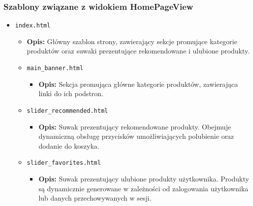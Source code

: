 \documentclass[12pt,a4paper,oneside]{article}
\theoremstyle{definition}
\numberwithin{equation}{section}
\begin{document}
\begin{itemize}
    \subsubsection{Szablony związane z widokiem HomePageView}
    \begin{itemize}
        \item \texttt{index.html}
        \begin{itemize}
            \item \textbf{Opis:} 
            Główny szablon strony, zawierający sekcje promujące kategorie produktów oraz suwaki prezentujące rekomendowane i ulubione produkty.
            
            \item \texttt{main\_banner.html} 
            \begin{itemize}
                \item \textbf{Opis:} 
                Sekcja promująca główne kategorie produktów, zawierająca linki do ich podstron.
            \end{itemize}
    
            \item \texttt{slider\_recommended.html} 
            \begin{itemize}
                \item \textbf{Opis:} 
                Suwak prezentujący rekomendowane produkty. Obejmuje dynamiczną obsługę przycisków umożliwiających polubienie oraz dodanie do koszyka.
            \end{itemize}
    
            \item \texttt{slider\_favorites.html} 
            \begin{itemize}
                \item \textbf{Opis:} 
                Suwak prezentujący ulubione produkty użytkownika. Produkty są dynamicznie generowane w zależności od zalogowania użytkownika lub danych przechowywanych w sesji.
            \end{itemize}
        \end{itemize}
    \end{itemize}


\end{itemize}
\end{document}
